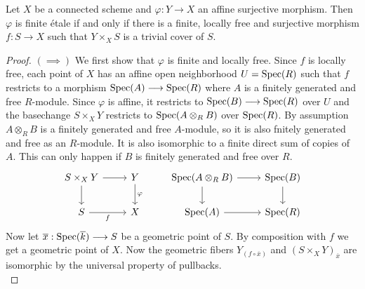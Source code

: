\begin{theorem} 
  \label{locallyTrivial}
  Let $X$ be a connected scheme and $\varphi : Y \to X$ an affine surjective morphism. Then $\varphi$ is finite \'etale if and only if there is a finite, locally free and surjective morphism $f: S \to X$ such that $Y \times_X S$ is a trivial cover of $S$.
\end{theorem}
\begin{proof}
  $(\implies)$
  We first show that $\varphi$ is finite and locally free. Since $f$ is locally free, each point of $X$ has an affine open neighborhood $U = \operatorname{Spec}(R)$ such that $f$ restricts to a morphism $\operatorname{Spec}(A) \longrightarrow \operatorname{Spec}(R)$ where $A$ is a finitely generated and free $R$-module. Since $\varphi$ is affine, it restricts to $\operatorname{Spec}(B) \longrightarrow \operatorname{Spec}(R)$ over $U$ and the basechange $S \times_X Y$ restricts to $\operatorname{Spec}(A \otimes_R B)$ over $\operatorname{Spec}(R)$. By assumption $A \otimes_R B$ is a finitely generated and free $A$-module, so it is also fnitely generated and free as an $R$-module. It is also isomorphic to a finite direct sum of copies of $A$. This can only happen if $B$ is finitely generated and free over $R$.
    \[
    \begin{tikzcd}
    	{S \times_X Y} & Y & {\Spec(A \otimes_RB)} & {\Spec(B)} \\
    	S & X & {\Spec(A)} & {\Spec(R)}
    	\arrow["\varphi", from=1-2, to=2-2]
    	\arrow["f"', from=2-1, to=2-2]
    	\arrow[from=1-1, to=1-2]
    	\arrow[from=1-1, to=2-1]
    	\arrow[from=1-3, to=2-3]
    	\arrow[from=2-3, to=2-4]
    	\arrow[from=1-3, to=1-4]
    	\arrow[from=1-4, to=2-4]
    \end{tikzcd}
    \]
  Now let $\overline{x} : \operatorname{Spec}(\overline{k}) \longrightarrow S$ be a geometric point of $S$. By composition with $f$ we get a geometric point of $X$. Now the geometric fibers $Y_{(f \circ \overline{x})}$ and $(S \times_X Y)_{\overline{x}}$  are isomorphic by the universal property of pullbacks. 
  \[
\]
\end{proof}
